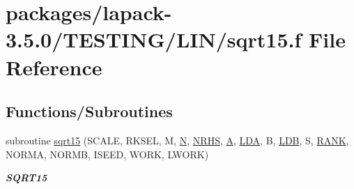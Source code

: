 \hypertarget{sqrt15_8f}{}\section{packages/lapack-\/3.5.0/\+T\+E\+S\+T\+I\+N\+G/\+L\+I\+N/sqrt15.f File Reference}
\label{sqrt15_8f}
\subsection*{Functions/\+Subroutines}
\begin{DoxyCompactItemize}
\item 
subroutine \hyperlink{group__single__lin_gaae4d0824738bd82d82585a131670bec3}{sqrt15} (S\+C\+A\+L\+E, R\+K\+S\+E\+L, M, \hyperlink{polmisc_8c_a0240ac851181b84ac374872dc5434ee4}{N}, \hyperlink{example__user_8c_aa0138da002ce2a90360df2f521eb3198}{N\+R\+H\+S}, \hyperlink{classA}{A}, \hyperlink{example__user_8c_ae946da542ce0db94dced19b2ecefd1aa}{L\+D\+A}, B, \hyperlink{example__user_8c_a50e90a7104df172b5a89a06c47fcca04}{L\+D\+B}, S, \hyperlink{splinemodule_8c_a3a88bcc63386de30443dacede2e01847}{R\+A\+N\+K}, N\+O\+R\+M\+A, N\+O\+R\+M\+B, I\+S\+E\+E\+D, W\+O\+R\+K, L\+W\+O\+R\+K)
\begin{DoxyCompactList}\small\item\em {\bfseries S\+Q\+R\+T15} \end{DoxyCompactList}\end{DoxyCompactItemize}
